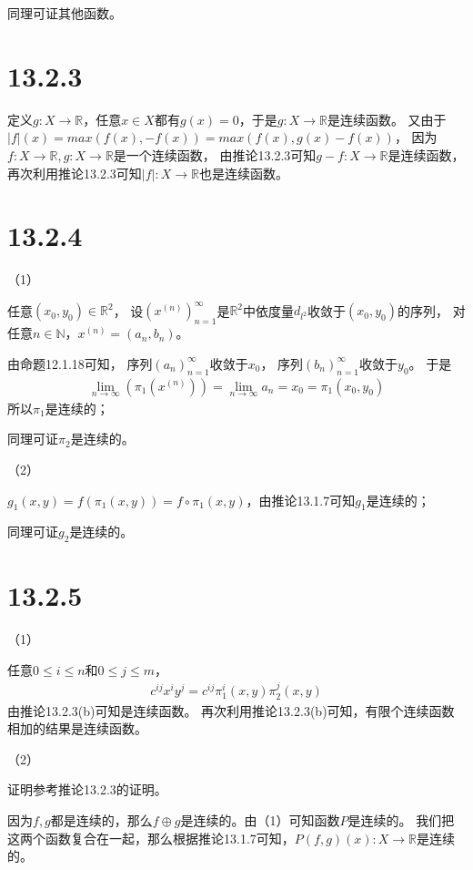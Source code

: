 \documentclass{article}
\begin{document}
同理可证其他函数。

\section*{13.2.3}
定义$g: X \to \mathbb{R}$，任意$x \in X$都有$g(x) = 0$，于是$g: X \to \mathbb{R}$是连续函数。
又由于$|f|(x) = max(f(x), -f(x)) = max(f(x), g(x) - f(x))$，
因为$f: X \to \mathbb{R}, g: X \to \mathbb{R}$是一个连续函数，
由推论13.2.3可知$g - f: X \to \mathbb{R}$是连续函数，
再次利用推论13.2.3可知$|f|: X \to \mathbb{R}$也是连续函数。

\section*{13.2.4}

（1）

任意$(x_0, y_0) \in \mathbb{R}^2$，
设$(x^{(n)})_{n = 1}^\infty$是$\mathbb{R}^2$中依度量$d_{l^2}$收敛于$(x_0, y_0)$的序列，
对任意$n \in \mathbb{N}$，$x^{(n)} = (a_n, b_n)$。

由命题12.1.18可知，
序列$(a_n)_{n = 1}^\infty$收敛于$x_0$，
序列$(b_n)_{n = 1}^\infty$收敛于$y_0$。
于是
\begin{align*}
  \lim\limits_{n \to \infty}  (\pi_1(x^{(n)})) = \lim\limits_{n \to \infty} a_n = x_0 = \pi_1(x_0, y_0)
\end{align*}
所以$\pi_1$是连续的；

同理可证$\pi_2$是连续的。


（2）

$g_1(x, y) = f(\pi_1(x, y)) = f \circ \pi_1(x, y)$，由推论13.1.7可知$g_1$是连续的；

同理可证$g_2$是连续的。

\section*{13.2.5}
（1）

任意$0 \leq i \leq n$和$0 \leq j \leq m$，
\begin{align*}
  c^{ij}x^iy^j = c^{ij}\pi_1^i(x, y) \pi_2^j(x, y)
\end{align*}
由推论13.2.3(b)可知是连续函数。
再次利用推论13.2.3(b)可知，有限个连续函数相加的结果是连续函数。

（2）

证明参考推论13.2.3的证明。

因为$f,g$都是连续的，那么$f \oplus g$是连续的。由（1）可知函数$P$是连续的。
我们把这两个函数复合在一起，那么根据推论13.1.7可知，$P(f,g)(x): X \to \mathbb{R}$是连续的。
\end{document}
